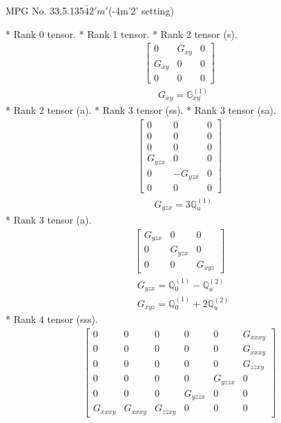 \documentclass[fleqn,8pt,landscape]{jsarticle}
\begin{document}
\setcounter{MaxMatrixCols}{32}

\renewcommand{\tablename}{Table~}
\renewcommand{\figurename}{Figure~}
\begin{center}
\LARGE
MPG No. 33.5.135\quad$\bar{4}2'm'$\quad(-4m'2' setting)
\end{center}
* Rank 0 tensor.
* Rank 1 tensor.
* Rank 2 tensor (s).
\begin{align*}
\begin{bmatrix} 0 & G_{xy} & 0 \\ G_{xy} & 0 & 0 \\ 0 & 0 & 0 \end{bmatrix}
\end{align*}
\begin{align*}
& G_{xy} = \mathbb{G}_{xy}^{(1)}
\end{align*}
* Rank 2 tensor (a).
* Rank 3 tensor (ss).
* Rank 3 tensor (sa).
\begin{align*}
\begin{bmatrix} 0 & 0 & 0 \\ 0 & 0 & 0 \\ 0 & 0 & 0 \\ G_{yzx} & 0 & 0 \\ 0 & - G_{yzx} & 0 \\ 0 & 0 & 0 \end{bmatrix}
\end{align*}
\begin{align*}
& G_{yzx} = 3 \mathbb{Q}_{u}^{(1)}
\end{align*}
* Rank 3 tensor (a).
\begin{align*}
\begin{bmatrix} G_{yzx} & 0 & 0 \\ 0 & G_{yzx} & 0 \\ 0 & 0 & G_{xyz} \end{bmatrix}
\end{align*}
\begin{align*}
& G_{yzx} = \mathbb{Q}_{0}^{(1)} - \mathbb{Q}_{u}^{(2)} \\
& G_{xyz} = \mathbb{Q}_{0}^{(1)} + 2 \mathbb{Q}_{u}^{(2)}
\end{align*}
* Rank 4 tensor (sss).
\begin{align*}
\begin{bmatrix} 0 & 0 & 0 & 0 & 0 & G_{xxxy} \\ 0 & 0 & 0 & 0 & 0 & G_{xxxy} \\ 0 & 0 & 0 & 0 & 0 & G_{zzxy} \\ 0 & 0 & 0 & 0 & G_{yzzx} & 0 \\ 0 & 0 & 0 & G_{yzzx} & 0 & 0 \\ G_{xxxy} & G_{xxxy} & G_{zzxy} & 0 & 0 & 0 \end{bmatrix}
\end{align*}
\end{document}
